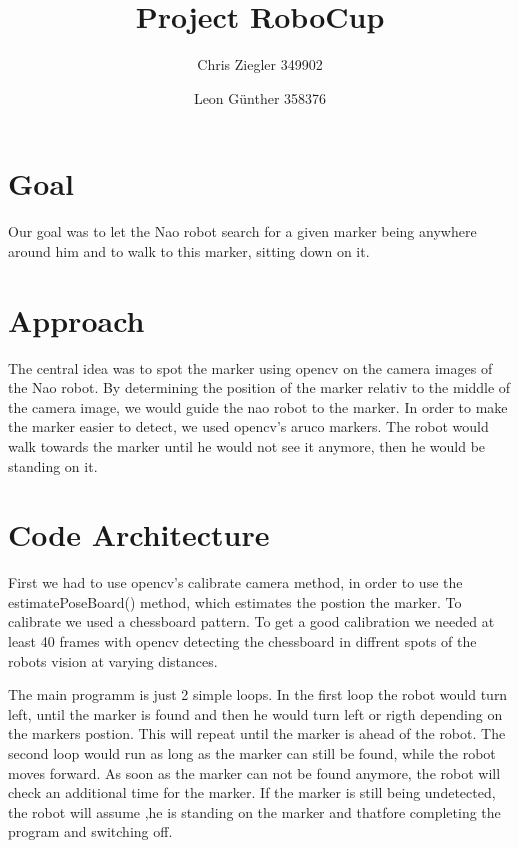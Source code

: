 \documentclass{article}
\title{Project RoboCup}
\author{
    Chris Ziegler 349902
    \and Leon Günther 358376
}
\date{}
\begin{document}
\maketitle

\tableofcontents

\section{Goal}
Our goal was to let the Nao robot search for a given marker being anywhere around him and to walk to this marker, sitting down on it.

\section{Approach}
The central idea was to spot the marker using opencv on the camera images of the Nao robot. By determining the position of the marker relativ to the middle of the camera image, we would guide the nao robot to the marker. In order to make the marker easier to detect, we used opencv's aruco markers. The robot would walk towards the marker until he would not see it anymore, then he would be standing on it.

\section{Code Architecture}
First we had to use opencv's calibrate camera method, in order to use the estimatePoseBoard() method, which estimates the postion the marker. To calibrate we used a chessboard pattern. To get a good calibration we needed at least 40 frames with opencv detecting the chessboard in diffrent spots of the robots vision at varying distances.

The main programm is just 2 simple loops. In the first loop the robot would turn left, until the marker is found and then he would turn left or rigth depending on the markers postion. This will repeat until the marker is ahead of the robot. The second loop would run as long as the marker can still be found, while the robot moves forward. As soon as the marker can not be found anymore, the robot will check an additional time for the marker. If the marker is still being undetected, the robot will assume ,he is standing on the marker and thatfore completing the program and switching off.
\end{document}
